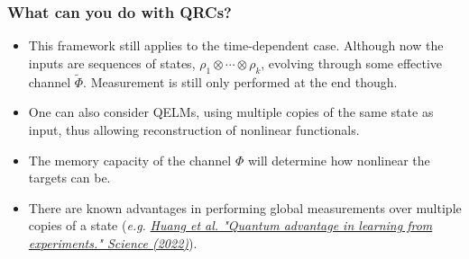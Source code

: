 \documentclass{beamer}
\begin{document}





\begin{frame}
\frametitle{What can you do with QRCs?}

\begin{itemize}
    \item This framework still applies to the time-dependent case. Although now the inputs are sequences of states, $\rho_1\otimes\cdots\otimes\rho_k$, evolving through some effective channel $\tilde\Phi$. Measurement is still only performed at the end though.
    \item One can also consider QELMs, using multiple copies of the same state as input, thus allowing reconstruction of nonlinear functionals.
    \item The memory capacity of the channel $\Phi$ will determine how nonlinear the targets can be.
    \item There are known advantages in performing global measurements over multiple copies of a state (\textit{e.g.} \href{https://www.science.org/doi/10.1126/science.abn7293}{\textit{Huang et al. "Quantum advantage in learning from experiments." Science (2022)}}).
\end{itemize}

\end{frame}
\end{document}

